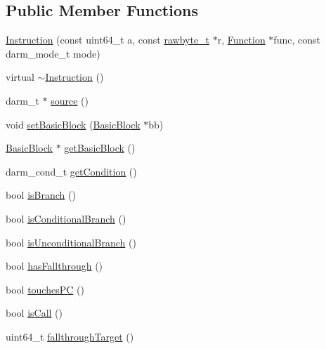 \subsection*{\-Public \-Member \-Functions}
\begin{DoxyCompactItemize}
\item 
\hyperlink{class_e_p_a_x_1_1_instruction_a4e347d9655c0c4f3f9ea5a2168825d0c}{\-Instruction} (const uint64\-\_\-t a, const \hyperlink{_e_p_a_x_common_internal_8hpp_a17755bdd71c02e656c667b16de61dd7b}{rawbyte\-\_\-t} $\ast$r, \hyperlink{class_e_p_a_x_1_1_function}{\-Function} $\ast$func, const darm\-\_\-mode\-\_\-t mode)
\item 
virtual \hyperlink{class_e_p_a_x_1_1_instruction_acba01d9121bc060ee462d80cc34fc7fc}{$\sim$\-Instruction} ()
\item 
darm\-\_\-t $\ast$ \hyperlink{class_e_p_a_x_1_1_instruction_a890f727eb1f9fec8368af54cf8688b97}{source} ()
\item 
void \hyperlink{class_e_p_a_x_1_1_instruction_a38277ea3536685fc8f03fecd186302f8}{set\-Basic\-Block} (\hyperlink{class_e_p_a_x_1_1_basic_block}{\-Basic\-Block} $\ast$bb)
\item 
\hyperlink{class_e_p_a_x_1_1_basic_block}{\-Basic\-Block} $\ast$ \hyperlink{class_e_p_a_x_1_1_instruction_afeafa6b86ee4e118663439c907a5c89b}{get\-Basic\-Block} ()
\item 
darm\-\_\-cond\-\_\-t \hyperlink{class_e_p_a_x_1_1_instruction_a0571ec1274ce9c264b2091fb7d679986}{get\-Condition} ()
\item 
bool \hyperlink{class_e_p_a_x_1_1_instruction_af6355646396d8a907a27822f074cc677}{is\-Branch} ()
\item 
bool \hyperlink{class_e_p_a_x_1_1_instruction_a4e9f0285e1bc78ffb0ce120ba1644c8c}{is\-Conditional\-Branch} ()
\item 
bool \hyperlink{class_e_p_a_x_1_1_instruction_aa2262112acef930a6bab1c5d37651486}{is\-Unconditional\-Branch} ()
\item 
bool \hyperlink{class_e_p_a_x_1_1_instruction_a42bc25733ce0d1095c0235d75fe22d77}{has\-Fallthrough} ()
\item 
bool \hyperlink{class_e_p_a_x_1_1_instruction_a0905e9164967ddbfa9b746676ed3e221}{touches\-P\-C} ()
\item 
bool \hyperlink{class_e_p_a_x_1_1_instruction_a75f19cced51e7904d97e7f3224a40279}{is\-Call} ()
\item 
uint64\-\_\-t \hyperlink{class_e_p_a_x_1_1_instruction_a4d78a9d0f7ab52c678f3ff52a411eed6}{fallthrough\-Target} ()
\item 

\end{DoxyCompactItemize}
